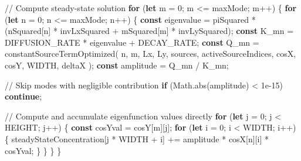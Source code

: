 \documentclass[
  letterpaper,
  DIV=11,
  numbers=noendperiod]{scrreprt}
\newenvironment{Shaded}{\begin{snugshade}}{\end{snugshade}}
\newcommand{\BuiltInTok}[1]{\textcolor[rgb]{0.00,0.23,0.31}{#1}}
\newcommand{\CommentTok}[1]{\textcolor[rgb]{0.37,0.37,0.37}{#1}}
\newcommand{\ControlFlowTok}[1]{\textcolor[rgb]{0.00,0.23,0.31}{\textbf{#1}}}
\newcommand{\DecValTok}[1]{\textcolor[rgb]{0.68,0.00,0.00}{#1}}
\newcommand{\FloatTok}[1]{\textcolor[rgb]{0.68,0.00,0.00}{#1}}
\newcommand{\FunctionTok}[1]{\textcolor[rgb]{0.28,0.35,0.67}{#1}}
\newcommand{\KeywordTok}[1]{\textcolor[rgb]{0.00,0.23,0.31}{\textbf{#1}}}
\newcommand{\NormalTok}[1]{\textcolor[rgb]{0.00,0.23,0.31}{#1}}
\newcommand{\OperatorTok}[1]{\textcolor[rgb]{0.37,0.37,0.37}{#1}}
\begin{document}
\begin{Shaded}
\begin{Highlighting}[]
    \CommentTok{// Compute steady{-}state solution}
    \ControlFlowTok{for}\NormalTok{ (}\KeywordTok{let}\NormalTok{ m }\OperatorTok{=} \DecValTok{0}\OperatorTok{;}\NormalTok{ m }\OperatorTok{\textless{}=}\NormalTok{ maxMode}\OperatorTok{;}\NormalTok{ m}\OperatorTok{++}\NormalTok{) \{}
        \ControlFlowTok{for}\NormalTok{ (}\KeywordTok{let}\NormalTok{ n }\OperatorTok{=} \DecValTok{0}\OperatorTok{;}\NormalTok{ n }\OperatorTok{\textless{}=}\NormalTok{ maxMode}\OperatorTok{;}\NormalTok{ n}\OperatorTok{++}\NormalTok{) \{}
            \KeywordTok{const}\NormalTok{ eigenvalue }\OperatorTok{=}\NormalTok{ piSquared }\OperatorTok{*}\NormalTok{ (nSquared[n] }\OperatorTok{*}\NormalTok{ invLxSquared }\OperatorTok{+}\NormalTok{ mSquared[m] }\OperatorTok{*}\NormalTok{ invLySquared)}\OperatorTok{;}
            \KeywordTok{const}\NormalTok{ K\_mn }\OperatorTok{=}\NormalTok{ DIFFUSION\_RATE }\OperatorTok{*}\NormalTok{ eigenvalue }\OperatorTok{+}\NormalTok{ DECAY\_RATE}\OperatorTok{;}
            \KeywordTok{const}\NormalTok{ Q\_mn }\OperatorTok{=} \FunctionTok{constantSourceTermOptimized}\NormalTok{(}
\NormalTok{                n}\OperatorTok{,}
\NormalTok{                m}\OperatorTok{,}
\NormalTok{                Lx}\OperatorTok{,}
\NormalTok{                Ly}\OperatorTok{,}
\NormalTok{                sources}\OperatorTok{,}
\NormalTok{                activeSourceIndices}\OperatorTok{,}
\NormalTok{                cosX}\OperatorTok{,}
\NormalTok{                cosY}\OperatorTok{,}
\NormalTok{                WIDTH}\OperatorTok{,}
\NormalTok{                deltaX}
\NormalTok{            )}\OperatorTok{;}
            \KeywordTok{const}\NormalTok{ amplitude }\OperatorTok{=}\NormalTok{ Q\_mn }\OperatorTok{/}\NormalTok{ K\_mn}\OperatorTok{;}

            \CommentTok{// Skip modes with negligible contribution}
            \ControlFlowTok{if}\NormalTok{ (}\BuiltInTok{Math}\OperatorTok{.}\FunctionTok{abs}\NormalTok{(amplitude) }\OperatorTok{\textless{}} \FloatTok{1e{-}15}\NormalTok{) }\ControlFlowTok{continue}\OperatorTok{;}

            \CommentTok{// Compute and accumulate eigenfunction values directly}
            \ControlFlowTok{for}\NormalTok{ (}\KeywordTok{let}\NormalTok{ j }\OperatorTok{=} \DecValTok{0}\OperatorTok{;}\NormalTok{ j }\OperatorTok{\textless{}}\NormalTok{ HEIGHT}\OperatorTok{;}\NormalTok{ j}\OperatorTok{++}\NormalTok{) \{}
                \KeywordTok{const}\NormalTok{ cosYval }\OperatorTok{=}\NormalTok{ cosY[m][j]}\OperatorTok{;}
                \ControlFlowTok{for}\NormalTok{ (}\KeywordTok{let}\NormalTok{ i }\OperatorTok{=} \DecValTok{0}\OperatorTok{;}\NormalTok{ i }\OperatorTok{\textless{}}\NormalTok{ WIDTH}\OperatorTok{;}\NormalTok{ i}\OperatorTok{++}\NormalTok{) \{}
\NormalTok{                    steadyStateConcentration[j }\OperatorTok{*}\NormalTok{ WIDTH }\OperatorTok{+}\NormalTok{ i] }\OperatorTok{+=}\NormalTok{ amplitude }\OperatorTok{*}\NormalTok{ cosX[n][i] }\OperatorTok{*}\NormalTok{ cosYval}\OperatorTok{;}
\NormalTok{                \}}
\NormalTok{            \}}
\NormalTok{        \}}
\NormalTok{    \}}


\end{Highlighting}
\end{Shaded}
\end{document}

